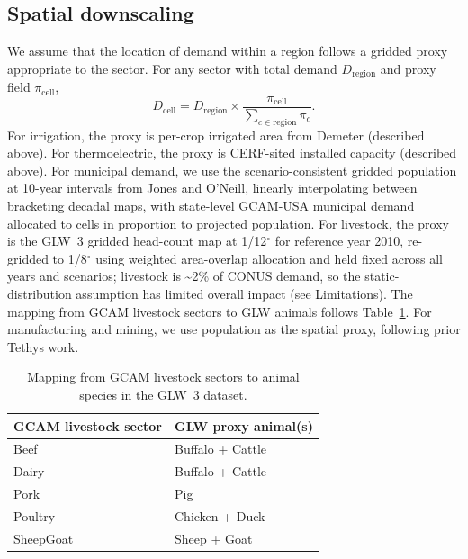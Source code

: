 \documentclass[fleqn,10pt]{wlscirep}
\begin{document}
\subsection*{Spatial downscaling}

We assume that the location of demand within a region follows a gridded proxy appropriate to the sector. For any sector with total demand $D_{\mathrm{region}}$ and proxy field $\pi_{\mathrm{cell}}$,
\begin{equation}
D_{\mathrm{cell}} = D_{\mathrm{region}} \times \frac{\pi_{\mathrm{cell}}}{\sum_{c \in \mathrm{region}} \pi_{c}}.
\label{eq:spatial}
\end{equation}
For irrigation, the proxy is per-crop irrigated area from Demeter (described above). For thermoelectric, the proxy is CERF-sited installed capacity (described above). For municipal demand, we use the scenario-consistent gridded population at 10-year intervals from Jones and O'Neill\cite{Jones_2016}, linearly interpolating between bracketing decadal maps, with state-level GCAM-USA municipal demand allocated to cells in proportion to projected population. For livestock, the proxy is the GLW~3 gridded head-count map\cite{Gilbert2018} at 1/12$^{\circ}$ for reference year 2010, re-gridded to 1/8$^{\circ}$ using weighted area-overlap allocation and held fixed across all years and scenarios; livestock is \textasciitilde2\% of CONUS demand, so the static-distribution assumption has limited overall impact (see Limitations). The mapping from GCAM livestock sectors to GLW animals follows Table~\ref{tab:livestock}. For manufacturing and mining, we use population as the spatial proxy, following prior Tethys work\cite{Khan2023}.

\begin{table}[ht]
\centering
\begin{tabular}{ll}
\toprule
\textbf{GCAM livestock sector} & \textbf{GLW proxy animal(s)} \\
\midrule
Beef      & Buffalo + Cattle \\
Dairy     & Buffalo + Cattle \\
Pork      & Pig \\
Poultry   & Chicken + Duck \\
SheepGoat & Sheep + Goat \\
\bottomrule
\end{tabular}
\caption{Mapping from GCAM livestock sectors to animal species in the GLW~3 dataset.}
\label{tab:livestock}
\end{table}
\end{document}
